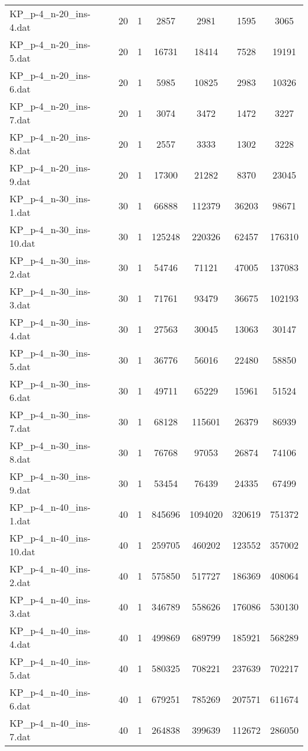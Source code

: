 \begin{table}[!ht]
\begin{tabular}{lcccccc}
KP\_p-4\_n-20\_ins-4.dat & 20 & 1 & 2857 & 2981 & 1595 & 3065 \\
KP\_p-4\_n-20\_ins-5.dat & 20 & 1 & 16731 & 18414 & 7528 & 19191 \\
KP\_p-4\_n-20\_ins-6.dat & 20 & 1 & 5985 & 10825 & 2983 & 10326 \\
KP\_p-4\_n-20\_ins-7.dat & 20 & 1 & 3074 & 3472 & 1472 & 3227 \\
KP\_p-4\_n-20\_ins-8.dat & 20 & 1 & 2557 & 3333 & 1302 & 3228 \\
KP\_p-4\_n-20\_ins-9.dat & 20 & 1 & 17300 & 21282 & 8370 & 23045 \\
KP\_p-4\_n-30\_ins-1.dat & 30 & 1 & 66888 & 112379 & 36203 & 98671 \\
KP\_p-4\_n-30\_ins-10.dat & 30 & 1 & 125248 & 220326 & 62457 & 176310 \\
KP\_p-4\_n-30\_ins-2.dat & 30 & 1 & 54746 & 71121 & 47005 & 137083 \\
KP\_p-4\_n-30\_ins-3.dat & 30 & 1 & 71761 & 93479 & 36675 & 102193 \\
KP\_p-4\_n-30\_ins-4.dat & 30 & 1 & 27563 & 30045 & 13063 & 30147 \\
KP\_p-4\_n-30\_ins-5.dat & 30 & 1 & 36776 & 56016 & 22480 & 58850 \\
KP\_p-4\_n-30\_ins-6.dat & 30 & 1 & 49711 & 65229 & 15961 & 51524 \\
KP\_p-4\_n-30\_ins-7.dat & 30 & 1 & 68128 & 115601 & 26379 & 86939 \\
KP\_p-4\_n-30\_ins-8.dat & 30 & 1 & 76768 & 97053 & 26874 & 74106 \\
KP\_p-4\_n-30\_ins-9.dat & 30 & 1 & 53454 & 76439 & 24335 & 67499 \\
KP\_p-4\_n-40\_ins-1.dat & 40 & 1 & 845696 & 1094020 & 320619 & 751372 \\
KP\_p-4\_n-40\_ins-10.dat & 40 & 1 & 259705 & 460202 & 123552 & 357002 \\
KP\_p-4\_n-40\_ins-2.dat & 40 & 1 & 575850 & 517727 & 186369 & 408064 \\
KP\_p-4\_n-40\_ins-3.dat & 40 & 1 & 346789 & 558626 & 176086 & 530130 \\
KP\_p-4\_n-40\_ins-4.dat & 40 & 1 & 499869 & 689799 & 185921 & 568289 \\
KP\_p-4\_n-40\_ins-5.dat & 40 & 1 & 580325 & 708221 & 237639 & 702217 \\
KP\_p-4\_n-40\_ins-6.dat & 40 & 1 & 679251 & 785269 & 207571 & 611674 \\
KP\_p-4\_n-40\_ins-7.dat & 40 & 1 & 264838 & 399639 & 112672 & 286050 \\

\end{tabular}
\end{table}
